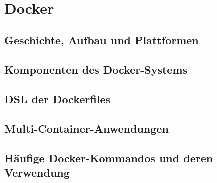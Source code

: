 \chapter{Docker}
\label{cha:docker}
\section{Geschichte, Aufbau und Plattformen}
\label{sec:docker-basics}
\section{Komponenten des Docker-Systems}
\label{sec:docker-komponenten}
\section{DSL der Dockerfiles}
\label{sec:dockerfiles}
\section{Multi-Container-Anwendungen}
\label{sec:docker-multi-container-anwendungen}
\section{Häufige Docker-Kommandos und deren Verwendung}
\label{docker-verwendung}
